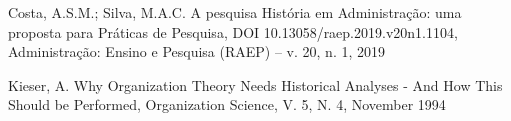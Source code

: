 \documentclass[
12pt,		%
openright,	%
twoside,  %
a4paper,			%
chapter=TITLE,		%
english,			%
french,				%
spanish,			%
brazil				%
]{USPSC-classe/USPSC}
\begin{document}
\begin{flushleft}
\begin{flushleft}
\begin{flushleft}
\begin{flushleft}
\begin{flushleft}
\begin{flushleft}
\begin{flushleft}
\begin{flushleft}
\begin{flushleft}
 Costa, A.S.M.; Silva, M.A.C. A pesquisa Hist\'oria em Administra\c{c}\~ao: uma proposta para Pr\'aticas de Pesquisa, DOI 10.13058/raep.2019.v20n1.1104, Administra\c{c}\~ao: Ensino e Pesquisa (RAEP) – v. 20, n. 1, 2019
\end{flushleft}


\end{flushleft}


\end{flushleft}


\end{flushleft}


\end{flushleft}


\end{flushleft}


\end{flushleft}


\end{flushleft}


\end{flushleft}


\begin{flushleft}
\begin{flushleft}
\begin{flushleft}
\begin{flushleft}
\begin{flushleft}
\begin{flushleft}
\begin{flushleft}
\begin{flushleft}
\begin{flushleft}
[Kieser, 1994] Kieser, A. Why Organization Theory Needs Historical Analyses - And How This Should be Performed, Organization Science, V. 5, N. 4, November 1994
\end{flushleft}


\end{flushleft}


\end{flushleft}


\end{flushleft}


\end{flushleft}


\end{flushleft}


\end{flushleft}


\end{flushleft}


\end{flushleft}
\end{document}
